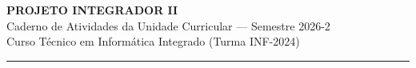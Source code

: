 \documentclass[12pt,a4paper]{article}
\begin{document}
\begin{center}
    {\Large \textbf{PROJETO INTEGRADOR II}}\\
    Caderno de Atividades da Unidade Curricular — Semestre 2026-2\\
    Curso Técnico em Informática Integrado (Turma INF-2024)
\end{center}

\vspace{0.5cm}
\hrule
\vspace{0.8cm}

\tableofcontents
\newpage


\end{document}

